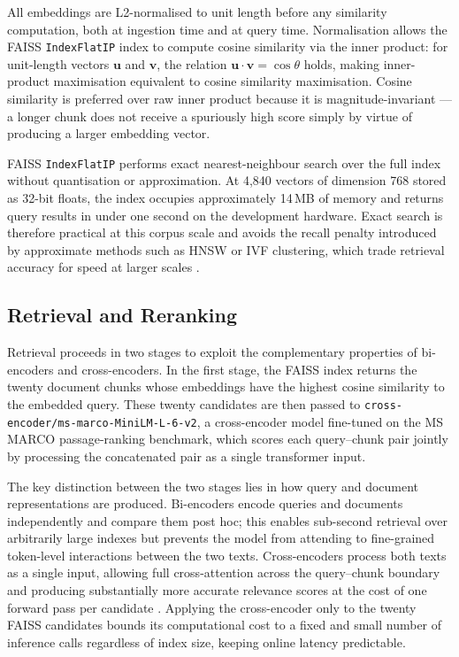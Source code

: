 All embeddings are L2-normalised to unit length before any similarity computation, both at ingestion time and at query time. Normalisation allows the FAISS \texttt{IndexFlatIP} index to compute cosine similarity via the inner product: for unit-length vectors $\mathbf{u}$ and $\mathbf{v}$, the relation $\mathbf{u} \cdot \mathbf{v} = \cos\theta$ holds, making inner-product maximisation equivalent to cosine similarity maximisation. Cosine similarity is preferred over raw inner product because it is magnitude-invariant — a longer chunk does not receive a spuriously high score simply by virtue of producing a larger embedding vector.

FAISS \texttt{IndexFlatIP} performs exact nearest-neighbour search over the full index without quantisation or approximation. At 4,840 vectors of dimension 768 stored as 32-bit floats, the index occupies approximately 14\,MB of memory and returns query results in under one second on the development hardware. Exact search is therefore practical at this corpus scale and avoids the recall penalty introduced by approximate methods such as HNSW or IVF clustering, which trade retrieval accuracy for speed at larger scales \cite{lewis2020rag}.

\subsection{Retrieval and Reranking}

Retrieval proceeds in two stages to exploit the complementary properties of bi-encoders and cross-encoders. In the first stage, the FAISS index returns the twenty document chunks whose embeddings have the highest cosine similarity to the embedded query. These twenty candidates are then passed to \texttt{cross-encoder/ms-marco-MiniLM-L-6-v2}, a cross-encoder model fine-tuned on the MS MARCO passage-ranking benchmark, which scores each query--chunk pair jointly by processing the concatenated pair as a single transformer input.

The key distinction between the two stages lies in how query and document representations are produced. Bi-encoders encode queries and documents independently and compare them post hoc; this enables sub-second retrieval over arbitrarily large indexes but prevents the model from attending to fine-grained token-level interactions between the two texts. Cross-encoders process both texts as a single input, allowing full cross-attention across the query--chunk boundary and producing substantially more accurate relevance scores at the cost of one forward pass per candidate \cite{gao2023ragsurvey}. Applying the cross-encoder only to the twenty FAISS candidates bounds its computational cost to a fixed and small number of inference calls regardless of index size, keeping online latency predictable.

